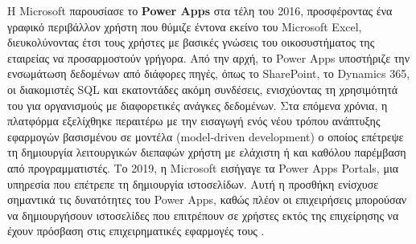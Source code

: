                 Η Microsoft παρουσίασε το \textbf{Power Apps} στα τέλη του 2016, προσφέροντας ένα γραφικό περιβάλλον χρήστη που θύμιζε έντονα εκείνο του Microsoft Excel, διευκολύνοντας έτσι τους χρήστες με βασικές γνώσεις του οικοσυστήματος της εταιρείας να προσαρμοστούν γρήγορα. Από την αρχή, το Power Apps υποστήριζε την ενσωμάτωση δεδομένων από διάφορες πηγές, όπως το SharePoint, το Dynamics 365, οι διακομιστές SQL και εκατοντάδες ακόμη συνδέσεις, ενισχύοντας τη χρησιμότητά του για οργανισμούς με διαφορετικές ανάγκες δεδομένων. Στα επόμενα χρόνια, η πλατφόρμα εξελίχθηκε περαιτέρω με την εισαγωγή ενός νέου τρόπου ανάπτυξης εφαρμογών βασισμένου σε μοντέλα (model-driven development) ο οποίος επέτρεψε τη δημιουργία λειτουργικών διεπαφών χρήστη με ελάχιστη ή και καθόλου παρέμβαση από προγραμματιστές. Το 2019, η Microsoft εισήγαγε τα Power Apps Portals, μια υπηρεσία που επέτρεπε τη δημιουργία ιστοσελίδων. Αυτή η προσθήκη ενίσχυσε σημαντικά τις δυνατότητες του Power Apps, καθώς πλέον οι επιχειρήσεις μπορούσαν να δημιουργήσουν ιστοσελίδες που επιτρέπουν σε χρήστες εκτός της επιχείρησης να έχουν πρόσβαση στις επιχειρηματικές εφαρμογές τους \cite{PowerAppsLeung}.

